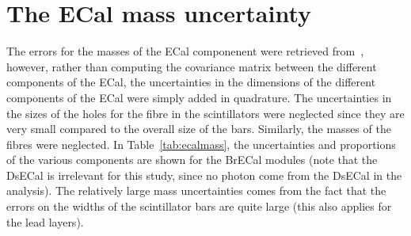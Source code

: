 \section*{The \Gls{ECal} mass uncertainty}
\label{par:ecalmassuncertainty}
The errors for the masses of the \Gls{ECal} componenent were retrieved
from~\cite{DomBrailsford2016}, however, rather than computing the
covariance matrix between the different components of the \Gls{ECal},
the uncertainties in the dimensions of the different components of the
\Gls{ECal} were simply added in quadrature. The uncertainties in the
sizes of the holes for the fibre in the scintillators were neglected
since they are very small compared to the overall size of the
bars. Similarly, the masses of the fibres were neglected. In
Table~\ref{tab:ecalmass}, the uncertainties and proportions of the
various components are shown for the \Gls{BrECal} modules (note that
the \Gls{DsECal} is irrelevant for this study, since no photon come
from the \Gls{DsECal} in the analysis). The relatively large mass
uncertainties comes from the fact that the errors on the widths of the
scintillator bars are quite large (this also applies for the lead
layers).

